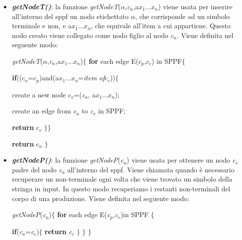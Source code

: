 \begin{itemize}
	\item \textbf{\textit{getNodeT()}}: la funzione \textit{getNodeT}($\alpha$,\textit{c}$_n$,a$x_1\dots x_n$) viene usata per inserire all'interno del sppf un nodo etichettato $\alpha$, che corrisponde ad un simbolo terminale e non, e a$x_1\dots x_n$, che equivale all'item a cui appartiene. Questo nodo creato viene collegato come nodo figlio al nodo \textit{c}$_n$. Viene definita nel seguente modo:\par
	\hspace{0.5cm}\textit{getNodeT}($\alpha$,\textit{c}$_n$,a$x_1\dots x_n$)$\{$ \textbf{for} each edge E($c_p$,$c_c$) in SPPF$\{$\par  \hspace{5.5cm}\textbf{if}(($c_n$=$c_p$)and(a$x_1\dots x_n$=\textit{item of}$c_c$))$\{$ \par \hspace{5.5cm}create a new node c$_v$=(\textit{c}$_a$, a$x_1\dots x_n$);  \par 
	 \hspace{5.5cm}create an edge from \textit{c}$_n$ to \textit{c}$_v$ in SPPF;\par 
	 \hspace{5.5cm}\textbf{return }c$_v$ $\}\}$\par
	 \hspace{5.2cm}\textbf{return }c$_n$ $\}$
	 \item \textbf{\textit{getNodeP()}}: la funzione \textit{getNodeP}(\textit{c}$_u$) viene usata per ottenere un nodo \textit{c}$_v$ padre del nodo \textit{c}$_u$ all'interno del sppf. Viene chiamata quando è necessario recuperare un non-terminale ogni volta che viene trovato un simbolo della stringa in input. In questo modo recuperiamo i restanti non-terminali del corpo di una produzione. Viene definita nel seguente modo:\par
	 \hspace{1.5cm}\textit{getNodeP}(\textit{c}$_u$)$\{$ \textbf{for} each edge E(\textit{c}$_p$,\textit{c}$_c$)in SPPF $\{$  \par 
	 \hspace{4.4cm}\textbf{if}(\textit{c}$_u$=\textit{c}$_c$)$\{$ \textbf{return} \textit{c}$_c$ $\}$ $\}$ $\}$
\end{itemize}
